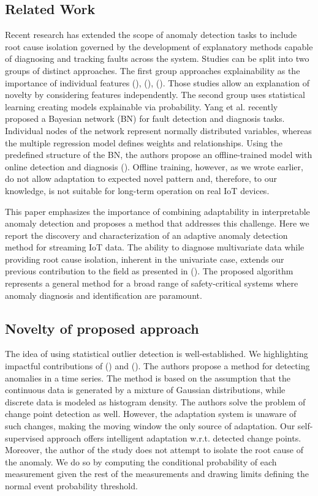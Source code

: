\subsection{Related Work}
Recent research has extended the scope of anomaly detection tasks to include root cause isolation governed by the development of explanatory methods capable of diagnosing and tracking faults across the system. Studies can be split into two groups of distinct approaches. The first group approaches explainability as the importance of individual features (\cite{Carletti2019}), (\cite{Nguyen2019}), (\cite{Amarasinghe2018}). Those studies allow an explanation of novelty by considering features independently. The second group uses statistical learning creating models explainable via probability. Yang et al. recently proposed a Bayesian network (BN) for fault detection and diagnosis tasks. Individual nodes of the network represent normally distributed variables, whereas the multiple regression model defines weights and relationships. Using the predefined structure of the BN, the authors propose an offline-trained model with online detection and diagnosis (\cite{Yang2022}). Offline training, however, as we wrote earlier, do not allow adaptation to expected novel pattern and, therefore, to our knowledge, is not suitable for long-term operation on real IoT devices.

This paper emphasizes the importance of combining adaptability in interpretable anomaly detection and proposes a method that addresses this challenge. Here we report the discovery and characterization of an adaptive anomaly detection method for streaming IoT data. The ability to diagnose multivariate data while providing root cause isolation, inherent in the univariate case, extends our previous contribution to the field as presented in (\cite{Wadinger2023}). The proposed algorithm represents a general method for a broad range of safety-critical systems where anomaly diagnosis and identification are paramount.

\subsection{Novelty of proposed approach}
The idea of using statistical outlier detection is well-established. We highlighting impactful contributions of (\cite{Yamanishi2002}) and (\cite{Yamanishi2004}). The authors propose a method for detecting anomalies in a time series. The method is based on the assumption that the continuous data is generated by a mixture of Gaussian distributions, while discrete data is modeled as histogram density. The authors solve the problem of change point detection as well. However, the adaptation system is unaware of such changes, making the moving window the only source of adaptation. Our self-supervised approach offers intelligent adaptation w.r.t. detected change points. Moreover, the author of the study does not attempt to isolate the root cause of the anomaly. We do so by computing the conditional probability of each measurement given the rest of the measurements and drawing limits defining the normal event probability threshold.


